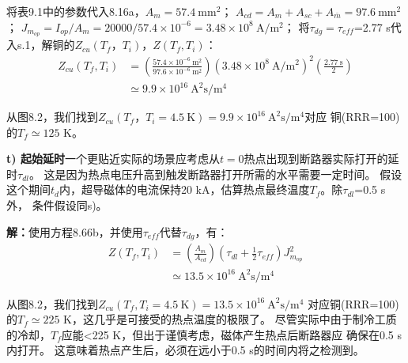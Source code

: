 将表9.1中的参数代入8.16a，$A_m=57.4\ \mathrm{mm^2}$；
$A_{cd}=A_m+A_{sc}+A_{\bar{m}}=97.6\ \mathrm{ mm^2}$；
$J_{m_{op}}=I_{op}/A_m=20000/57.4\times 10^{-6}=3.48\times 10^8\ \mathrm{ A/m^2}$；
将$\tau_{dg}=\tau_{eff}$=2.77 s代入s.1，解铜的$Z_{cu}(T_f，T_i)$，$Z(T_f,T_i)$：
\begin{align*}%
Z_{cu}(T_f,T_i)&=(\frac{57.4\times 10^{-6}\ \mathrm{m^2}}{97.6\times 10^{-6}\ \mathrm{m^2}})(3.48\times 10^8\ \mathrm{A/m^2})^2(\frac{2.77\ \mathrm{s}}{2})\\
&\simeq 9.9\times 10^{16}\ \mathrm{A^2s/m^4}
\end{align*}

从图8.2，我们找到$Z_{cu}(T_f，T_i=4.5\ \mathrm{K})=9.9\times 10^{16}\ \mathrm{A^2 s/m^4}$对应
铜(RRR=100)的$T_f\simeq 125$ K。

\textbf{t) 起始延时}\qquad 一个更贴近实际的场景应考虑从$t=0$热点出现到断路器实际打开的延时$\tau_{dl}$。
这是因为热点电压升高到触发断路器打开所需的水平需要一定时间。
假设这个期间$t_d$内，超导磁体的电流保持20 kA，估算热点最终温度$T_f$。除$\tau_{dl}$=0.5 s外，
条件假设同s)。

\textbf{解：}使用方程8.66b，并使用$\tau_{eff}$代替$\tau_{dg}$，有：
\begin{align*}%
Z(T_f,T_i)&=\left(\frac{A_m}{A_{cd}}\right)\left(\tau_{dl}+\frac{1}{2}\tau_{eff}\right)J_{m_{op}}^2\\
&\simeq 13.5\times 10^{16}\ \mathrm{A^2s/m^4}
\end{align*}

从图8.2，我们找到$Z_{cu}(T_f,T_i=4.5\ \mathrm{K})=13.5\times 10^{16}\ \mathrm{A^2 s/m^4}$
对应铜(RRR=100)的$T_f\simeq 225$ K，这几乎是可接受的热点温度的极限了。
尽管实际中由于制冷工质的冷却，$T_f$应能<225 K，但出于谨慎考虑，磁体产生热点后断路器应
确保在0.5 s内打开。
这意味着热点产生后，必须在远小于0.5 s的时间内将之检测到。

